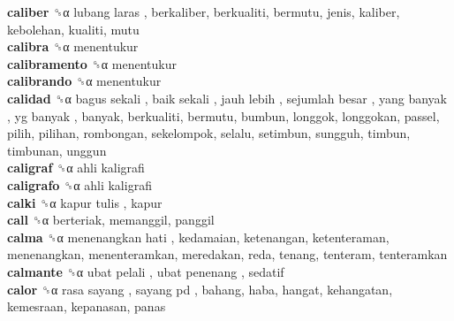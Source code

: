 \textbf{caliber} ␝α   lubang laras , berkaliber, berkualiti, bermutu, jenis, kaliber, kebolehan, kualiti, mutu  \\
\textbf{calibra} ␝α  menentukur  \\
\textbf{calibramento} ␝α  menentukur  \\
\textbf{calibrando} ␝α  menentukur  \\
\textbf{calidad} ␝α   bagus sekali ,  baik sekali ,  jauh lebih ,  sejumlah besar ,  yang banyak ,  yg banyak , banyak, berkualiti, bermutu, bumbun, longgok, longgokan, passel, pilih, pilihan, rombongan, sekelompok, selalu, setimbun, sungguh, timbun, timbunan, unggun  \\
\textbf{caligraf} ␝α   ahli kaligrafi   \\
\textbf{caligrafo} ␝α   ahli kaligrafi   \\
\textbf{calki} ␝α   kapur tulis , kapur  \\
\textbf{call} ␝α  berteriak, memanggil, panggil  \\
\textbf{calma} ␝α   menenangkan hati , kedamaian, ketenangan, ketenteraman, menenangkan, menenteramkan, meredakan, reda, tenang, tenteram, tenteramkan  \\
\textbf{calmante} ␝α   ubat pelali ,  ubat penenang , sedatif  \\
\textbf{calor} ␝α   rasa sayang ,  sayang pd , bahang, haba, hangat, kehangatan, kemesraan, kepanasan, panas  \\
